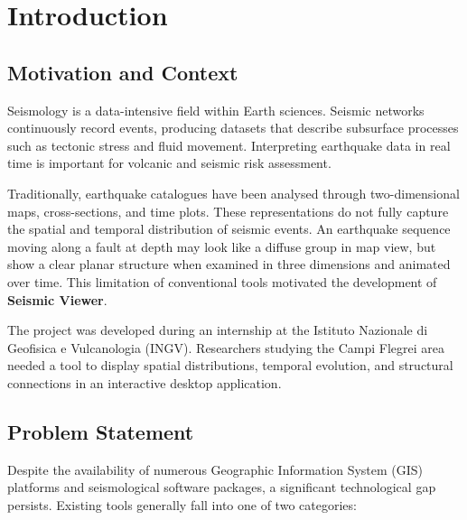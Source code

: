 
\chapter{Introduction}
\label{ch:introduction}

\section{Motivation and Context}
\label{sec:motivation}

Seismology is a data-intensive field within Earth sciences. Seismic networks continuously record events, producing datasets that describe subsurface processes such as tectonic stress and fluid movement. Interpreting earthquake data in real time is important for volcanic and seismic risk assessment.

Traditionally, earthquake catalogues have been analysed through two-dimensional maps, cross-sections, and time plots. These representations do not fully capture the spatial and temporal distribution of seismic events. An earthquake sequence moving along a fault at depth may look like a diffuse group in map view, but show a clear planar structure when examined in three dimensions and animated over time. This limitation of conventional tools motivated the development of \textbf{Seismic Viewer}.

The project was developed during an internship at the Istituto Nazionale di Geofisica e Vulcanologia (INGV). Researchers studying the Campi Flegrei area needed a tool to display spatial distributions, temporal evolution, and structural connections in an interactive desktop application.

\section{Problem Statement}
\label{sec:problem}

Despite the availability of numerous Geographic Information System (GIS) platforms and seismological software packages, a significant technological gap persists. Existing tools generally fall into one of two categories:

